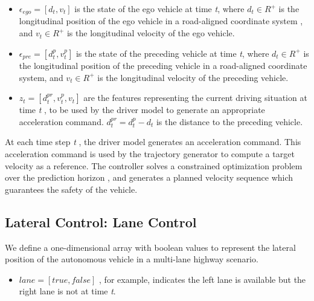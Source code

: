 \begin{itemize}
\item $\epsilon_{ego} = [d_t, v_t]$ is the state of the ego vehicle at time \textit{t}, where $d_t \in R^+$ is the longitudinal position of the ego vehicle in a road-aligned coordinate system \cite{Frenet2008}, and $v_t \in R^+$ is the longitudinal velocity of the ego vehicle.
\item $\epsilon_{pre} = [d_t^p, v_t^p]$ is the state of the preceding vehicle at time \textit{t}, where $d_t \in R^+$ is the longitudinal position of the preceding vehicle in a road-aligned coordinate system, and $v_t \in R^+$ is the longitudinal velocity of the preceding vehicle.
\item $z_t =  [d_t^{pr}, v_t^p, v_t]$ are the features representing the current driving situation at time \textit{t} , to be used by the driver model to generate an appropriate acceleration command. $d_t^{pr} = d_t^p - d_t$ is the distance to the preceding vehicle.
\end{itemize}

At each time step \textit{t} , the driver model generates an acceleration command. This acceleration command is used by the trajectory generator to compute a target velocity as a reference. The controller solves a constrained optimization problem over the prediction horizon , and generates a planned velocity sequence which guarantees the safety of the vehicle.

\subsection{Lateral Control: Lane Control}

We define a one-dimensional array with boolean values to represent the lateral position of the autonomous vehicle in a multi-lane highway scenario.

\begin{itemize}
\item $lane = [true, false]$ , for example, indicates the left lane is available but the right lane is not at time \textit{t}.
\end{itemize}

